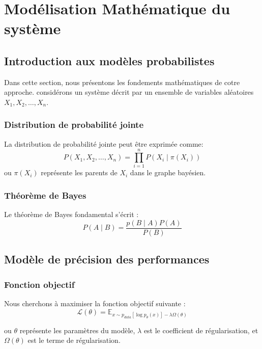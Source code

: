 \chapter{Modélisation Mathématique du système}
\section{Introduction aux modèles probabilistes}
Dans cette section, nous présentons les fondements mathématiques de cotre approche. considérons un système décrit par un ensemble de variables aléatoires $X_1, X_2, \dots, X_n$.

\subsection{Distribution de probabilité jointe}
La distribution de probabilité jointe peut être exprimée comme:
\begin{equation}
	P(X_1, X_2, \dots, X_n) = \prod_{i=1}^n P(X_i \mid \pi(X_i))
	\label{eq:joint-distribution}
\end{equation}
ou $\pi(X_i)$ représente les parents de $X_i$ dans le graphe bayésien.

\subsection{Théorème de Bayes}
Le théorème de Bayes fondamental s'écrit : 
\begin{equation}
	P(A \mid B) = \frac{p(B \mid A) P(A)}{P(B)}
	\label{eq:bayes-theorem}
\end{equation}

\section{Modèle de précision des performances}

\subsection{Fonction objectif}
Nous cherchons à maximiser la fonction objectif suivante : 
\begin{equation}
	\mathcal{L}(\theta) = \mathbb{E}_{x \sim p_{data}[\log p_\theta(x)] - \lambda \Omega(\theta)}
	\label{eq:objective-function}
\end{equation}

ou $\theta$ représente les paramètres du modèle, $\lambda$  est le coefficient de régularisation, et $\Omega(\theta)$ est le terme de régularisation.

